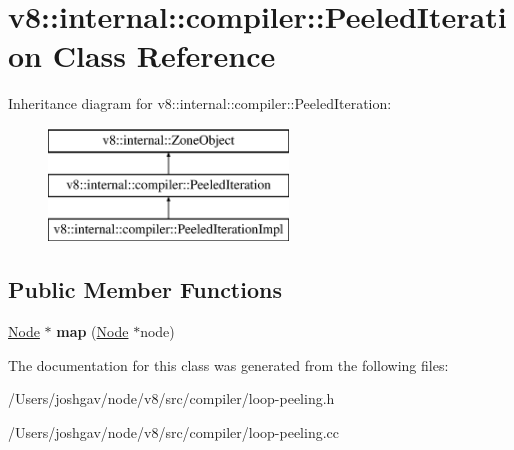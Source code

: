 \hypertarget{classv8_1_1internal_1_1compiler_1_1_peeled_iteration}{}\section{v8\+:\+:internal\+:\+:compiler\+:\+:Peeled\+Iteration Class Reference}
\label{classv8_1_1internal_1_1compiler_1_1_peeled_iteration}
Inheritance diagram for v8\+:\+:internal\+:\+:compiler\+:\+:Peeled\+Iteration\+:\begin{figure}[H]
\begin{center}
\leavevmode
\includegraphics[height=3.000000cm]{classv8_1_1internal_1_1compiler_1_1_peeled_iteration}
\end{center}
\end{figure}
\subsection*{Public Member Functions}
\begin{DoxyCompactItemize}
\item 
\hyperlink{classv8_1_1internal_1_1compiler_1_1_node}{Node} $\ast$ {\bfseries map} (\hyperlink{classv8_1_1internal_1_1compiler_1_1_node}{Node} $\ast$node)\hypertarget{classv8_1_1internal_1_1compiler_1_1_peeled_iteration_a2257414d4b2c975aa831506a4ea9685c}{}\label{classv8_1_1internal_1_1compiler_1_1_peeled_iteration_a2257414d4b2c975aa831506a4ea9685c}

\end{DoxyCompactItemize}


The documentation for this class was generated from the following files\+:\begin{DoxyCompactItemize}
\item 
/\+Users/joshgav/node/v8/src/compiler/loop-\/peeling.\+h\item 
/\+Users/joshgav/node/v8/src/compiler/loop-\/peeling.\+cc\end{DoxyCompactItemize}

